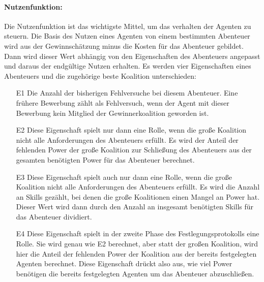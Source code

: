 \documentclass[fleqn,10pt]{SelfArx} %
\begin{document}
\paragraph{Nutzenfunktion:}
Die Nutzenfunktion ist das wichtigste Mittel, um das verhalten der Agenten zu steuern. Die Basis des Nutzen eines Agenten von einem bestimmten Abenteuer wird aus der Gewinnschätzung minus die Kosten für das Abenteuer gebildet. Dann wird dieser Wert abhängig von den Eigenschaften des Abenteuers angepasst und daraus der endgültige Nutzen erhalten. Es werden vier Eigenschaften eines Abenteuers und die zugehörige beste Koalition unterschieden:
\begin{itemize}
  \item[E1] Die Anzahl der bisherigen Fehlversuche bei diesem Abenteuer. Eine frühere Bewerbung zählt als Fehlversuch, wenn der Agent mit dieser Bewerbung kein Mitglied der Gewinnerkoalition geworden ist.
  \item[E2] Diese Eigenschaft spielt nur dann eine Rolle, wenn die große Koalition nicht alle Anforderungen des Abenteuers erfüllt. Es wird der Anteil der fehlenden Power der große Koalition zur Schließung des Abenteuers aus der gesamten benötigten Power für das Abenteuer berechnet. 
  \item[E3] Diese Eigenschaft spielt auch nur dann eine Rolle, wenn die große Koalition nicht alle Anforderungen des Abenteuers erfüllt. Es wird die Anzahl an Skills gezählt, bei denen die große Koalitionen einen Mangel an Power hat. Dieser Wert wird dann durch den Anzahl an insgesamt benötigten Skills für das Abenteuer dividiert.
  \item[E4] Diese Eigenschaft spielt in der zweite Phase des Festlegungsprotokolls eine Rolle. Sie wird genau wie E2 berechnet, aber statt der großen Koalition, wird hier die Anteil der fehlenden Power der Koalition aus der bereits festgelegten Agenten berechnet. Diese Eigenschaft drückt also aus, wie viel Power benötigen die bereits festgelegten Agenten um das Abenteuer abzuschließen. 
\end{itemize}
\end{document}
